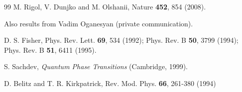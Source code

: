 \documentclass[letterpaper, twocolumn,superscriptaddress, showpacs,preprintnumbers,amsmath,amssymb]{revtex4}
\begin{document}
\begin{thebibliography}{99}
M. Rigol, V. Dunjko and M. Olshanii,
Nature {\bf 452}, 854 (2008).

Also results from Vadim Oganesyan (private communication).

D. S. Fisher, Phys. Rev. Lett. {\bf 69}, 534 (1992); Phys. Rev. B {\bf 50}, 3799 (1994); Phys. Rev. B {\bf 51}, 6411 (1995).

S. Sachdev, {\it Quantum Phase Transitions} (Cambridge, 1999).

D. Belitz and T. R. Kirkpatrick,
Rev. Mod. Phys. {\bf66}, 261-380 (1994)

\end{thebibliography}
\end{document}
